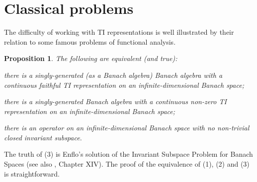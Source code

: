 \documentclass[11pt]{article}
\newcounter{arbenum}
\newenvironment{arbenumerate}{\begin{list}{{\rm(\arabic{arbenum})}}%
{\usecounter{arbenum}}}{\end{list}}
\newtheorem{prop}[thm]{Proposition}
\newenvironment{Proof}{{\it Proof. }}{}%
\newcommand{\Detail}[1]{}
\newcommand{\LX}{{\cal L}(X)}
\begin{document}
\section{Classical problems}\label{S4}

The difficulty of working with TI representations is well illustrated by their
relation to some famous problems of functional analysis.

\begin{prop} \label{P2}
The following are equivalent (and true):
\begin{arbenumerate}
\item there is a singly-generated (as a Banach algebra) Banach algebra with a
continuous faithful TI representation on an infinite-dimensional Banach space;
\item there is a singly-generated Banach algebra with a continuous non-zero TI
representation on an infinite-dimensional Banach space;
\item there is an operator on an infinite-dimensional Banach space with no
non-trivial closed invariant subspace.
\end{arbenumerate}
\end{prop}

\begin{Proof}
The truth of (3) is Enflo's solution of the Invariant Subspace Problem for Banach
Spaces \cite{Enflo} (see also \cite{Read}, \cite{Beauzamy} Chapter XIV).
The proof of the equivalence of (1), (2) and (3) is straightforward.
\Detail{%
\begin{description}
\item{(1) $\Rightarrow$ (2)} is trivial.
\item{(2) $\Rightarrow$ (3)}.
Let~$A$ be a Banach algebra with generator~$a$ and let~$\pi$ be a continuous TI
representation of~$A$ on a Banach space~$X$ such that $\pi(a) \ne 0$.    Then
there is no non-trivial closed invariant subspace of $\pi(a)$, since any such
subspace would be invariant for $\pi(A)$, contradicting the fact that~$\pi$ is TI.
\item{(3) $\Rightarrow$ (1)}.
Given an operator~$T$ on a Banach space~$X$ with no non-trivial closed invariant
subspace, let~$A$ be the closed subalgebra of $\LX$ generated by~$T$.   Then the
natural representation of~$A$ on~$X$ is TI, faithful and continuous.
\end{description}}
\end{Proof}
\end{document}
